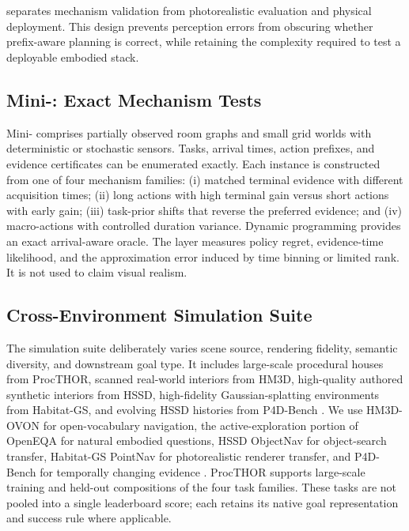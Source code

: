 \section{\bench{}}
\label{sec:benchmark}

\bench{} separates mechanism validation from photorealistic evaluation and physical deployment.
This design prevents perception errors from obscuring whether prefix-aware planning is correct, while retaining the complexity required to test a deployable embodied stack.

\subsection{Mini-\taskname{}: Exact Mechanism Tests}

Mini-\taskname{} comprises partially observed room graphs and small grid worlds with deterministic or stochastic sensors.
Tasks, arrival times, action prefixes, and evidence certificates can be enumerated exactly.
Each instance is constructed from one of four mechanism families:
(i) matched terminal evidence with different acquisition times;
(ii) long actions with high terminal gain versus short actions with early gain;
(iii) task-prior shifts that reverse the preferred evidence; and
(iv) macro-actions with controlled duration variance.
Dynamic programming provides an exact arrival-aware oracle.
The layer measures policy regret, evidence-time likelihood, and the approximation error induced by time binning or limited \jet{} rank.
It is not used to claim visual realism.

\subsection{Cross-Environment Simulation Suite}
\label{sec:cross-environment}

The simulation suite deliberately varies scene source, rendering fidelity, semantic diversity, and downstream goal type.
It includes large-scale procedural houses from ProcTHOR, scanned real-world interiors from HM3D, high-quality authored synthetic interiors from HSSD, high-fidelity Gaussian-splatting environments from Habitat-GS, and evolving HSSD histories from P4D-Bench
\citep{savva2019habitat,ramakrishnan2021hm3d,deitke2022procthor,khanna2024hssd,xia2026habitatgs}.
We use HM3D-OVON for open-vocabulary navigation, the active-exploration portion of OpenEQA for natural embodied questions, HSSD ObjectNav for object-search transfer, Habitat-GS PointNav for photorealistic renderer transfer, and P4D-Bench for temporally changing evidence
\citep{yokoyama2024hm3dovon,majumdar2024openeqa}.
ProcTHOR supports large-scale training and held-out compositions of the four \taskname{} task families.
These tasks are not pooled into a single leaderboard score; each retains its native goal representation and success rule where applicable.

